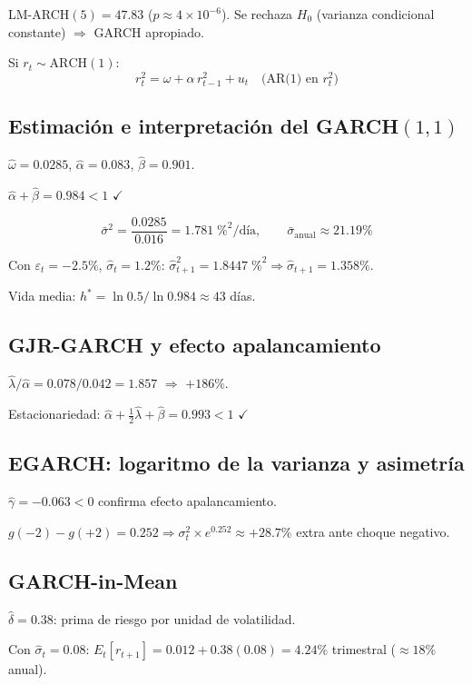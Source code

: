 \documentclass[12pt,letterpaper]{article}
\begin{document}
LM-ARCH$(5)=47.83$ ($p\approx4\times10^{-6}$). Se rechaza $H_0$
(varianza condicional constante) $\Rightarrow$ GARCH apropiado.

Si $r_t\sim\mathrm{ARCH}(1)$:
\[
  r_t^2=\omega+\alpha\,r_{t-1}^2+u_t \quad\text{(AR(1) en }r_t^2\text{)}
\]

\subsection{Estimaci\'on e interpretaci\'on del GARCH$(1,1)$}

$\hat{\omega}=0.0285$, $\hat{\alpha}=0.083$, $\hat{\beta}=0.901$.

$\hat{\alpha}+\hat{\beta}=0.984<1$ $\checkmark$

\[
  \bar{\sigma}^2=\frac{0.0285}{0.016}=1.781\;\%^2/\text{d\'ia},
  \qquad \bar{\sigma}_{\text{anual}}\approx21.19\%
\]

Con $\varepsilon_t=-2.5\%$, $\hat{\sigma}_t=1.2\%$:
$\hat{\sigma}_{t+1}^2=1.8447\;\%^2 \Rightarrow \hat{\sigma}_{t+1}=1.358\%$.

Vida media: $h^*=\ln0.5/\ln0.984\approx43$ d\'ias.

\subsection{GJR-GARCH y efecto apalancamiento}

$\hat{\lambda}/\hat{\alpha}=0.078/0.042=1.857$ $\Rightarrow$ $+186\%$.

Estacionariedad: $\hat{\alpha}+\frac{1}{2}\hat{\lambda}+\hat{\beta}=0.993<1$ $\checkmark$

\subsection{EGARCH: logaritmo de la varianza y asimetr\'ia}

$\hat{\gamma}=-0.063<0$ confirma efecto apalancamiento.

$g(-2)-g(+2)=0.252 \Rightarrow \sigma_t^2\times e^{0.252}\approx+28.7\%$ extra
ante choque negativo.

\subsection{GARCH-in-Mean}

$\hat{\delta}=0.38$: prima de riesgo por unidad de volatilidad.

Con $\hat{\sigma}_t=0.08$:
$E_t[r_{t+1}]=0.012+0.38(0.08)=4.24\%$ trimestral ($\approx18\%$ anual).
\end{document}
